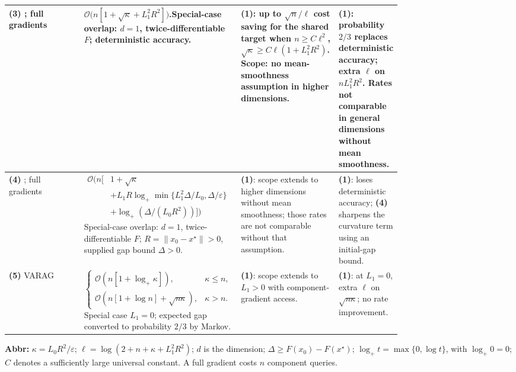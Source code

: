 \begin{table}[tp]
\begin{threeparttable}
\begin{tabularx}{\linewidth}{@{}>{\raggedright\arraybackslash}p{0.20\linewidth}>{\raggedright\arraybackslash}p{0.32\linewidth}>{\raggedright\arraybackslash}p{0.25\linewidth}>{\raggedright\arraybackslash}X@{}}
\midrule
\textbf{(3)} \citep[v2, Eq.~(8)]{fvTyurin2026v2}; full gradients
& $\mathcal{O}\bigl(n[1+\sqrt{\kappa}+L_1^2R^2]\bigr)$.\newline Special-case overlap: $d=1$, twice-differentiable $F$; deterministic accuracy.
& \textbf{(1)}: up to $\sqrt n/\ell$ cost saving for the shared target when $n\ge C\ell^2$, $\sqrt\kappa\ge C\ell(1+L_1^2R^2)$. Scope: no mean-smoothness assumption in higher dimensions.
& \textbf{(1)}: probability $2/3$ replaces deterministic accuracy; extra $\ell$ on $nL_1^2R^2$. Rates not comparable in general dimensions without mean smoothness. \\
\midrule
\textbf{(4)} \citep[v2, Thm.~4.3]{fvTyurin2026v2}; full gradients
& $\begin{aligned}\mathcal{O}\bigl(n[&1+\sqrt\kappa\\
 &+L_1R\log_+\min\{L_1^2\Delta/L_0,\Delta/\varepsilon\}\\
 &+\log_+(\Delta/(L_0R^2))]\bigr)\end{aligned}$\newline
Special-case overlap: $d=1$, twice-differentiable $F$; $R=\|x_0-x^\star\|>0$, supplied gap bound $\Delta>0$.
& \textbf{(1)}: scope extends to higher dimensions without mean smoothness; those rates are not comparable without that assumption.
& \textbf{(1)}: loses deterministic accuracy; \textbf{(4)} sharpens the curvature term using an initial-gap bound. \\
\midrule
\textbf{(5)} VARAG \citep[Thm.~1]{gsfsLanLiZhou2019}
& $\displaystyle\begin{cases}
\mathcal{O}(n[1+\log_+\kappa]),&\kappa\le n,\\
\mathcal{O}(n[1+\log n]+\sqrt{n\kappa}),&\kappa>n.
\end{cases}$\newline
Special case $L_1=0$; expected gap converted to probability $2/3$ by Markov.
& \textbf{(1)}: scope extends to $L_1>0$ with component-gradient access.
& \textbf{(1)}: at $L_1=0$, extra $\ell$ on $\sqrt{n\kappa}$; no rate improvement. \\
\bottomrule
\end{tabularx}
\begin{tablenotes}[flushleft]\footnotesize
\item[] \textbf{Abbr:} $\kappa=L_0R^2/\varepsilon$; $\ell=\log(2+n+\kappa+L_1^2R^2)$; $d$ is the dimension; $\Delta\ge F(x_0)-F(x^\star)$; $\log_+t=\max\{0,\log t\}$, with $\log_+0=0$; $C$ denotes a sufficiently large universal constant. A full gradient costs $n$ component queries.
\end{tablenotes}
\end{threeparttable}
\end{table}

